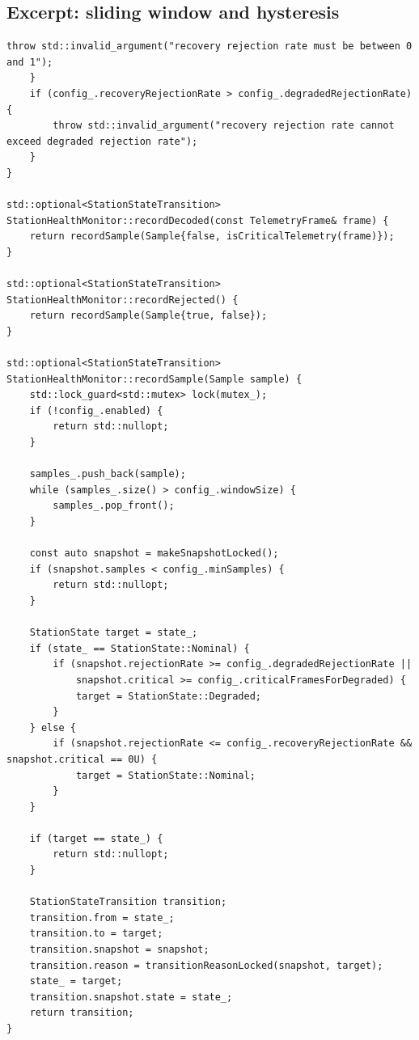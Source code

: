 \documentclass[10pt,a4paper]{article}
\begin{document}
\subsection{Excerpt: sliding window and hysteresis}
\begin{lstlisting}[caption={NOMINAL / DEGRADED state transitions}]
        throw std::invalid_argument("recovery rejection rate must be between 0 and 1");
    }
    if (config_.recoveryRejectionRate > config_.degradedRejectionRate) {
        throw std::invalid_argument("recovery rejection rate cannot exceed degraded rejection rate");
    }
}

std::optional<StationStateTransition> StationHealthMonitor::recordDecoded(const TelemetryFrame& frame) {
    return recordSample(Sample{false, isCriticalTelemetry(frame)});
}

std::optional<StationStateTransition> StationHealthMonitor::recordRejected() {
    return recordSample(Sample{true, false});
}

std::optional<StationStateTransition> StationHealthMonitor::recordSample(Sample sample) {
    std::lock_guard<std::mutex> lock(mutex_);
    if (!config_.enabled) {
        return std::nullopt;
    }

    samples_.push_back(sample);
    while (samples_.size() > config_.windowSize) {
        samples_.pop_front();
    }

    const auto snapshot = makeSnapshotLocked();
    if (snapshot.samples < config_.minSamples) {
        return std::nullopt;
    }

    StationState target = state_;
    if (state_ == StationState::Nominal) {
        if (snapshot.rejectionRate >= config_.degradedRejectionRate ||
            snapshot.critical >= config_.criticalFramesForDegraded) {
            target = StationState::Degraded;
        }
    } else {
        if (snapshot.rejectionRate <= config_.recoveryRejectionRate && snapshot.critical == 0U) {
            target = StationState::Nominal;
        }
    }

    if (target == state_) {
        return std::nullopt;
    }

    StationStateTransition transition;
    transition.from = state_;
    transition.to = target;
    transition.snapshot = snapshot;
    transition.reason = transitionReasonLocked(snapshot, target);
    state_ = target;
    transition.snapshot.state = state_;
    return transition;
}

\end{lstlisting}
\end{document}

